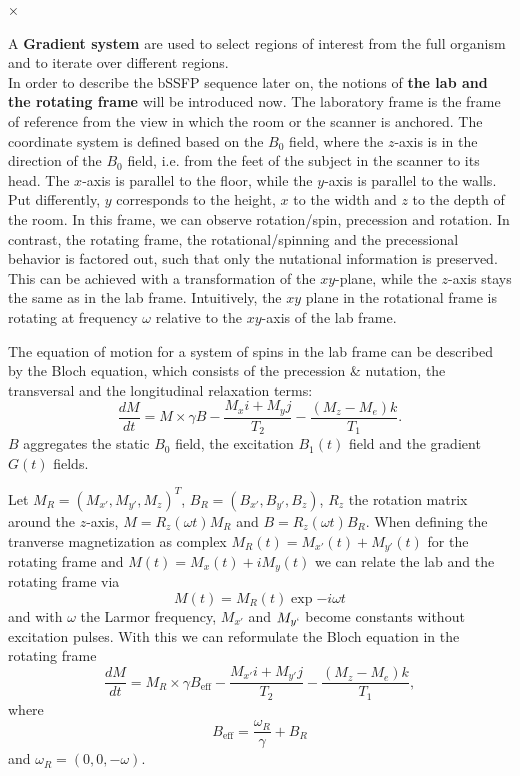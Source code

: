 \begin{table}[h]
 \begin{tabular}{}
  ×
 \end{tabular}
 \caption{}
 \label{t1t2-vals}
\end{table}




A \textbf{Gradient system} are used to select regions of interest from the full organism and to iterate over different regions. \\



In order to describe the bSSFP sequence later on, the notions of \textbf{the lab and the rotating frame} will be introduced now.
The laboratory frame is the frame of reference from the view in which the room or the scanner is anchored.
The coordinate system is defined based on the $B_0$ field, where the $z$-axis is in the direction of the $B_0$ field, i.e. from the feet of the subject in the scanner to its head.
The $x$-axis is parallel to the floor, while the $y$-axis is parallel to the walls.
Put differently, $y$ corresponds to the height, $x$ to the width and $z$ to the depth of the room.
In this frame, we can observe rotation/spin, precession and rotation.
In contrast, the rotating frame, the rotational/spinning and the precessional behavior is factored out, such that only the nutational information is preserved.
This can be achieved with a transformation of the $xy$-plane, while the $z$-axis stays the same as in the lab frame.
Intuitively, the $xy$ plane in the rotational frame is rotating at frequency $\omega$ relative to the $xy$-axis of the lab frame.

The equation of motion for a system of spins in the lab frame can be described by the Bloch equation, which consists of the precession \& nutation, the transversal and the longitudinal relaxation terms:
\[ \frac{dM}{dt} = M \times \gamma B - \frac{M_x i + M_y j}{T_2} - \frac{(M_z - M_e) k }{T_1}. \]
$B$ aggregates the static $B_0$ field, the excitation $B_1(t)$ field and the gradient $G(t)$ fields.

Let $M_{R} = \left( M_{x'}, M_{y'}, M_z \right)^T$, $B_R = \left( B_{x'}, B_{y'}, B_z \right)$, $R_z$ the rotation matrix around the $z$-axis, $M = R_z(\omega t) M_R$ and $B = R_z(\omega t) B_R$.
When defining the tranverse magnetization as complex $M_R(t) = M_{x'}(t) + M_{y'}(t)$ for the rotating frame and $M(t) = M_x(t) + i M_y(t)$ we can relate the lab and the rotating frame via
\[ M(t) = M_R(t) \exp{-i \omega t} \]
and with $\omega$ the Larmor frequency, $M_{x'}$ and $M_{y`}$ become constants without excitation pulses.
With this we can reformulate the Bloch equation in the rotating frame
\[ \frac{dM}{dt} = M_R \times \gamma B_{\text{eff}} - \frac{M_{x'} i + M_{y'} j}{T_2} - \frac{(M_z - M_e) k }{T_1}, \]
where \[ B_{\text{eff}} = \frac{\omega_R}{\gamma} + B_R \] and $\omega_R = \left( 0, 0, - \omega \right)$.

